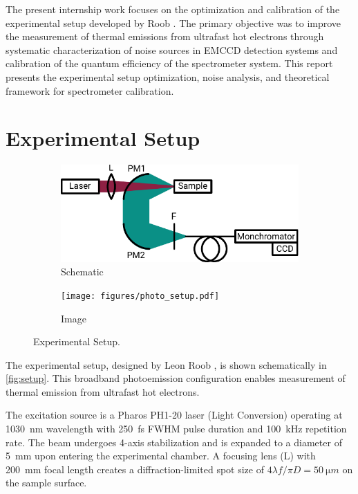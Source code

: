 \documentclass[
	parskip=half,
	a4paper,
]{scrarticle}
\begin{document}
The present internship work focuses on the optimization and calibration of the experimental setup developed by Roob \cite{roob_thermal_2025}. The primary objective was to improve the measurement of thermal emissions from ultrafast hot electrons through systematic characterization of noise sources in EMCCD detection systems \cite{andor_establishing_nodate, dr_jo_walters_sensitivity_2023} and calibration of the quantum efficiency of the spectrometer system. 
This report presents the experimental setup optimization, noise analysis, and theoretical framework for spectrometer calibration.

\clearpage
\section{Experimental Setup}

\begin{figure}[hb]
    \centering
     \begin{subfigure}{4in}
        \centering
        \includegraphics{figures/setup.pdf}
        \caption{Schematic}
    \end{subfigure}
    \hfill
    \begin{subfigure}{2in}
        \centering
        \texttt{[image: figures/photo\_setup.pdf]}
        \caption{Image}
    \end{subfigure}
    \label{fig:setup}
    \caption{Experimental Setup.}
\end{figure}

The experimental setup, designed by Leon Roob \cite{roob_thermal_2025}, is shown schematically in \autoref{fig:setup}. This broadband photoemission configuration enables measurement of thermal emission from ultrafast hot electrons.

The excitation source is a Pharos PH1-20 laser (Light Conversion) operating at \SI{1030}{nm} wavelength with \SI{250}{fs} FWHM pulse duration and \SI{100}{kHz} repetition rate. The beam undergoes 4-axis stabilization and is expanded to a diameter of \SI{5}{mm} upon entering the experimental chamber. A focusing lens (L) with \SI{200}{mm} focal length creates a diffraction-limited spot size of $4\lambda f / \pi D = \SI{50}{\micro m}$ on the sample surface.
\end{document}
